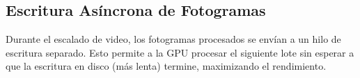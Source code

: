 \documentclass[11pt, a4paper]{article}
\begin{document}
\subsection{Escritura Asíncrona de Fotogramas}
Durante el escalado de video, los fotogramas procesados se envían a un hilo de escritura separado. Esto permite a la GPU procesar el siguiente lote sin esperar a que la escritura en disco (más lenta) termine, maximizando el rendimiento.


\end{document}
